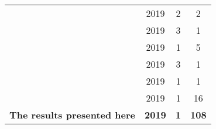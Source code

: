 \begin{table}[t]
\begin{center}
\begin{tabular}{lccc}
    \citet{kwiatkowski2019task}     & 2019 & 2 & 2 \\
    
    \citet{hwangbo2019learning}     & 2019 & 3 & 1 \\ %
    
    \citet{kriegman2019automated}   & 2019 & 1 & 5 \\
    
    \citet{nachum2019multi}         & 2019 & 3 & 1 \\  %
    
    \citet{akkaya2019solving}       & 2019 & 1 & 1 \\
    
    \citet{rosser2019sim2real}      & 2019 & 1 & 16 \\
    
    \textbf{The results presented here} & \textbf{2019} & \textbf{1} & \textbf{108} \\
    \bottomrule
\end{tabular}
\end{center}
\vspace{-1.75em}
\end{table}
